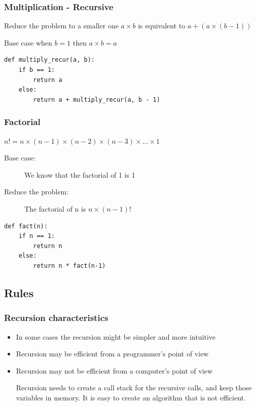 \documentclass[11pt]{beamer}
\begin{document}
\begin{frame}[fragile]\frametitle{Multiplication - Recursive}
\begin{block}{Reduce the problem to a smaller one}
\centering $a \times b$ is equivalent to $a + (a  \times (b - 1))$
\end{block}
\begin{block}{Base case}
\centering when $b = 1$ then $a \times b = a$
\end{block}
\pause
\begin{lstlisting}
def multiply_recur(a, b):
	if b == 1:
		return a
	else:
		return a + multiply_recur(a, b - 1)
\end{lstlisting}
\end{frame}

\begin{frame}[fragile]\frametitle{Factorial}
\begin{block}{}
\centering $n! = n \times (n - 1) \times (n - 2) \times (n - 3) \times \ldots \times 1$
\end{block}
\begin{description}
\item[Base case:] We know that the factorial of 1 is 1
\item[Reduce the problem:] The factorial of n is $n \times (n - 1)!$
\end{description}
\pause
\begin{lstlisting}
def fact(n):
	if n == 1:
		return n
	else:
		return n * fact(n-1)
\end{lstlisting}
\end{frame}

\subsection{Rules}

\begin{frame}\frametitle{Recursion characteristics}
\begin{itemize}
\item In some cases the recursion might be simpler and more intuitive
\item Recursion may be efficient from a programmer's point of view
\item Recursion may not be efficient from a computer's point of view
\begin{block}{}
Recursion needs to create a call stack for the recursive calls, and keep those variables in memory. It is easy to create an algorithm that is not efficient.
\end{block}
\end{itemize}
\end{frame}
\end{document}
